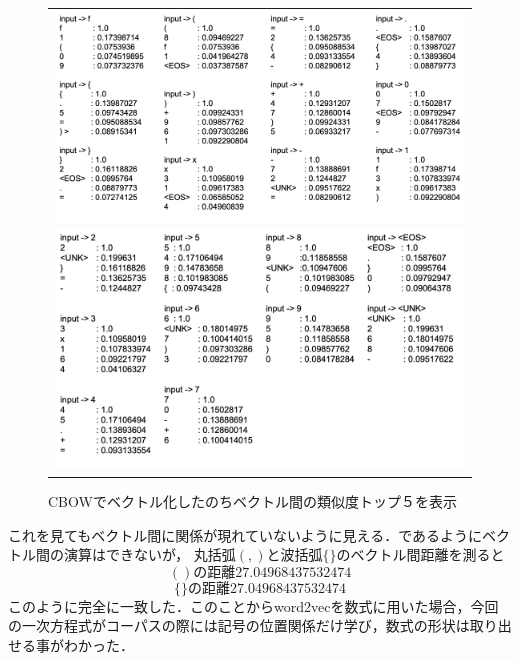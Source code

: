 \documentclass[a4j,11pt,report]{jsbook}
\begin{document}
\begin{figure}[htpb]
  \centering
  \begin{tabular}{c}
    \begin{minipage}{0.5\hsize}
      \centering
      \includegraphics[width=\linewidth]{image/1.png}
    \end{minipage}

    \begin{minipage}{0.5\hsize}
      \centering
      \includegraphics[width=\linewidth]{image/2.png}
    \end{minipage}

  \end{tabular}
  \caption{CBOWでベクトル化したのちベクトル間の類似度トップ５を表示}

  \label{fig:textresult}
\end{figure}

これを見てもベクトル間に関係が現れていないように見える．\cite{seq2seq}であるようにベクトル間の演算はできないが，
丸括弧$(,)$と波括弧$\{ \}$のベクトル間距離を測ると
\[
( ) の距離 27.04968437532474
\]
\[
\{ \} の距離 27.04968437532474
\]
このように完全に一致した．このことからword2vecを数式に用いた場合，今回の一次方程式がコーパスの際には記号の位置関係だけ学び，数式の形状は取り出せる事がわかった．
\end{document}
